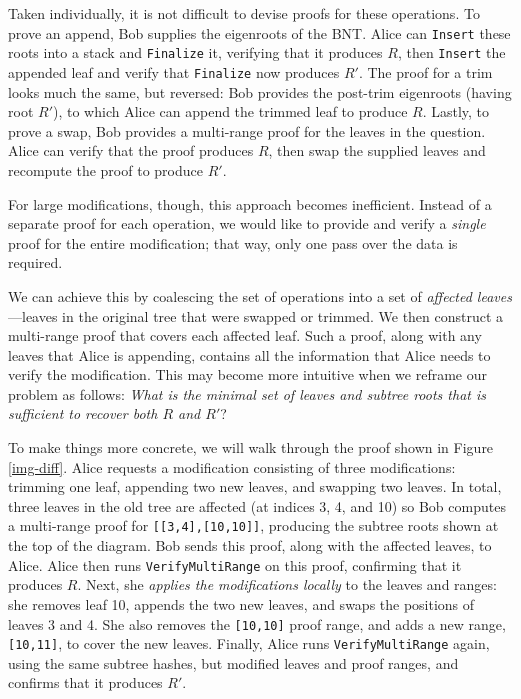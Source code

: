 \documentclass[twocolumn]{article}
\begin{document}
Taken individually, it is not difficult to devise proofs for these operations. To prove an append, Bob supplies the eigenroots of the BNT. Alice can \verb`Insert` these roots into a stack and \verb`Finalize` it, verifying that it produces $R$, then \verb`Insert` the appended leaf and verify that \verb`Finalize` now produces $R'$. The proof for a trim looks much the same, but reversed: Bob provides the post-trim eigenroots (having root $R'$), to which Alice can append the trimmed leaf to produce $R$. Lastly, to prove a swap, Bob provides a multi-range proof for the leaves in the question. Alice can verify that the proof produces $R$, then swap the supplied leaves and recompute the proof to produce $R'$.

For large modifications, though, this approach becomes inefficient. Instead of a separate proof for each operation, we would like to provide and verify a \textit{single} proof for the entire modification; that way, only one pass over the data is required.

We can achieve this by coalescing the set of operations into a set of \textit{affected leaves}---leaves in the original tree that were swapped or trimmed. We then construct a multi-range proof that covers each affected leaf. Such a proof, along with any leaves that Alice is appending, contains all the information that Alice needs to verify the modification. This may become more intuitive when we reframe our problem as follows: \textit{What is the minimal set of leaves and subtree roots that is sufficient to recover both $R$ and $R'$}?

To make things more concrete, we will walk through the proof shown in Figure \ref{img-diff}. Alice requests a modification consisting of three modifications: trimming one leaf, appending two new leaves, and swapping two leaves. In total, three leaves in the old tree are affected (at indices 3, 4, and 10) so Bob computes a multi-range proof for \verb`[[3,4],[10,10]]`, producing the subtree roots shown at the top of the diagram. Bob sends this proof, along with the affected leaves, to Alice. Alice then runs \verb`VerifyMultiRange` on this proof, confirming that it produces $R$. Next, she \textit{applies the modifications locally} to the leaves and ranges: she removes leaf 10, appends the two new leaves, and swaps the positions of leaves 3 and 4. She also removes the \verb`[10,10]` proof range, and adds a new range, \verb`[10,11]`, to cover the new leaves. Finally, Alice runs  \verb`VerifyMultiRange` again, using the same subtree hashes, but modified leaves and proof ranges, and confirms that it produces $R'$.
\end{document}
